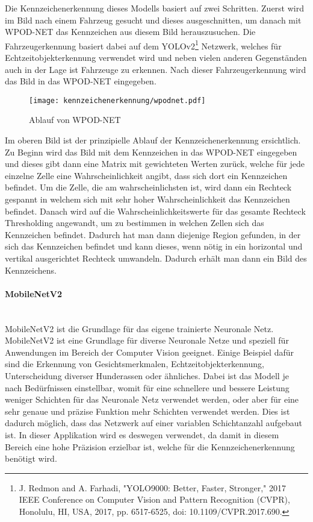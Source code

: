 Die Kennzeichenerkennung dieses Modells basiert auf zwei Schritten. Zuerst wird im Bild nach einem Fahrzeug gesucht und dieses ausgeschnitten, um danach mit 
WPOD-NET das Kennzeichen aus diesem Bild herauszusuchen. Die Fahrzeugerkennung basiert dabei auf dem 
YOLOv2\footnote{J. Redmon and A. Farhadi, "YOLO9000: Better, Faster, Stronger," 2017 IEEE Conference on Computer Vision and Pattern Recognition (CVPR), Honolulu, HI, USA, 2017, pp. 6517-6525, doi: 10.1109/CVPR.2017.690.} Netzwerk, 
welches für Echtzeitobjekterkennung verwendet wird und neben vielen anderen Gegenständen auch in der Lage ist Fahrzeuge zu erkennen. Nach dieser Fahrzeugerkennung wird das Bild in das WPOD-NET eingegeben.

\begin{figure}[H]
    \centering
    \texttt{[image: kennzeichenerkennung/wpodnet.pdf]}
    \caption{Ablauf von WPOD-NET}
\end{figure}

Im oberen Bild ist der prinzipielle Ablauf der Kennzeichenerkennung ersichtlich. Zu Beginn wird das Bild mit dem Kennzeichen in das WPOD-NET eingegeben 
und dieses gibt dann eine Matrix mit gewichteten Werten zurück, welche für jede einzelne Zelle eine Wahrscheinlichkeit angibt, dass sich dort ein Kennzeichen 
befindet. Um die Zelle, die am wahrscheinlichsten ist, wird dann ein Rechteck gespannt in welchem sich mit sehr hoher Wahrscheinlichkeit das Kennzeichen 
befindet. Danach wird auf die Wahrscheinlichkeitswerte für das gesamte Rechteck Thresholding angewandt, um zu bestimmen in welchen Zellen sich das Kennzeichen 
befindet. Dadurch hat man dann diejenige Region gefunden, in der sich das Kennzeichen befindet und kann dieses, wenn nötig in ein horizontal und vertikal 
ausgerichtet Rechteck umwandeln. Dadurch erhält man dann ein Bild des Kennzeichens.

\paragraph{MobileNetV2}\mbox{}\\
MobileNetV2 ist die Grundlage für das eigene trainierte Neuronale Netz. MobileNetV2 ist eine Grundlage für diverse Neuronale Netze und speziell für Anwendungen im Bereich der Computer Vision 
geeignet. Einige Beispiel dafür sind die Erkennung von Gesichtsmerkmalen, Echtzeitobjekterkennung, Unterscheidung diverser Hunderassen oder ähnliches. Dabei ist das Modell je nach Bedürfnissen 
einstellbar, womit für eine schnellere und bessere Leistung weniger Schichten für das Neuronale Netz verwendet werden, oder aber für eine sehr genaue und präzise Funktion mehr Schichten verwendet werden. 
Dies ist dadurch möglich, dass das Netzwerk auf einer variablen Schichtanzahl aufgebaut ist. In dieser Applikation wird es deswegen verwendet, da damit in diesem Bereich eine hohe Präzision erzielbar ist, 
welche für die Kennzeichenerkennung benötigt wird.

